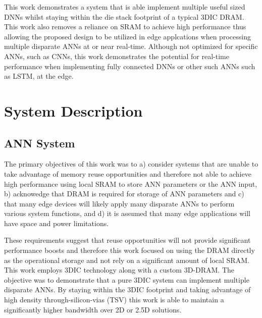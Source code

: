 \documentclass[journal]{IEEEtran}
\begin{document}
This work demonstrates a system that is able implement multiple useful sized DNNs whilst staying within the die stack footprint of a typical 3DIC DRAM.
This work also removes a reliance on SRAM to achieve high performance thus allowing the proposed design to be utilized in edge applcations when processing multiple disparate ANNs at or near real-time.
Although not optimized for specific ANNs, such as CNNs, this work demonstrates the potential for real-time performance when implementing fully connected DNNs or other such ANNs such as LSTM, at the edge.


\section{System Description}
\label{System Description}

\subsection{ANN System}
\label{sec:ANN System}

The primary objectives of this work was to a) consider systems that are unable to take advantage of memory reuse opportunities and therefore not able to achieve high performance using
local SRAM to store ANN parameters or the ANN input, b) acknowedge that DRAM is required for storage of ANN parameters and c) that many edge devices will likely apply many disparate ANNs
to perform various system functions, and d) it is assumed that many edge applications will have space and power limitations.

These requirements suggest that reuse opportunities will not provide significant performance boosts and therefore this work focused on using the DRAM directly as the operational
storage and not rely on a significant amount of local SRAM.
This work employs 3DIC technology along with a custom 3D-DRAM. The objective was to demonstrate that a pure 3DIC system can implement multiple disparate ANNs. By staying within the 3DIC footprint and taking advantage of high
density through-silicon-vias (TSV) this work is able to maintain a significantly higher bandwidth over 2D or 2.5D solutions.
\end{document}
